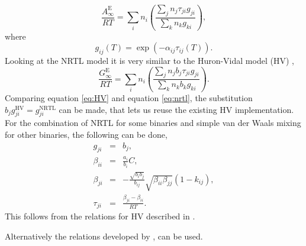 \documentclass[internal,english]{sintefmemo2012}
\newcommand{\excess}{\text{E}}
\begin{document}
\begin{equation}
  \frac{A_\infty^\excess}{RT} =
  \underset{i}{\sum}n_i\left(\frac{\underset{j}{\sum}n_j\tau_{ji}g_{ji}}{\underset{k}{\sum}n_k
      g_{ki}}\right),
  \label{eq:nrtl}
\end{equation}
where
\begin{equation}
  g_{ij}\left(T\right) =\exp{\left(-\alpha_{ij}\tau_{ij}\left(T\right)\right)}.
  \label{eq:gij}
\end{equation}
Looking at the NRTL model it is very similar to the Huron-Vidal model
(HV) \cite{Huron1979},
\begin{equation}
  \frac{G_\infty^\excess}{RT} =
  \underset{i}{\sum}n_i\left(\frac{\underset{j}{\sum}n_jb_{j}\tau_{ji}g_{ji}}{\underset{k}{\sum}n_kb_{k}
      g_{ki}}\right).
  \label{eq:HV}
\end{equation}
Comparing equation \ref{eq:HV} and equation \ref{eq:nrtl}, the
substitution $b_{j}g_{ji}^{\text{HV}} = g_{ji}^{\text{NRTL}}$ can be
made, that lets us reuse the existing HV implementation. For the
combination of NRTL for some binaries and simple van der Waals mixing
for other binaries, the following can be done,
\begin{eqnarray}
g_{ji} & = & b_{j},\\
\beta_{ii} & = & \frac{a_{i}}{b_{i}}C,\\
\beta_{ji} & = & -\frac{\sqrt{b_i b_j}}{b_{ij}}\sqrt{\beta_{ii}\beta_{jj}}\left(1-k_{ij}\right),\\
\tau_{ji} &=& \frac{\beta_{ji}-\beta_{ii}}{RT}.
\end{eqnarray}
This follows from the relations for HV described in
\cite{Wilhelmsen2013}.

Alternatively the relations developed by \cite{Twu2001}, can be used.
\end{document}
